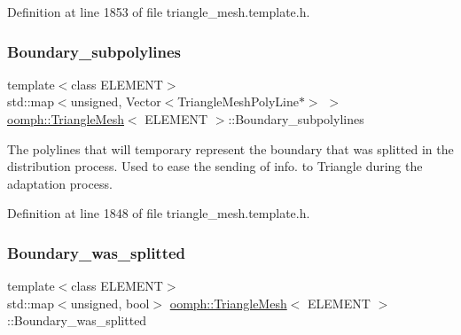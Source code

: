 Definition at line 1853 of file triangle\+\_\+mesh.\+template.\+h.

\mbox{\label{classoomph_1_1TriangleMesh_a4bc8a5ed3d771cec7c9f0de730b28a9f}} 
\subsubsection{\texorpdfstring{Boundary\+\_\+subpolylines}{Boundary\_subpolylines}}
{\footnotesize\ttfamily template$<$class E\+L\+E\+M\+E\+NT$>$ \\
std\+::map$<$unsigned, Vector$<$Triangle\+Mesh\+Poly\+Line$\ast$$>$ $>$ \hyperlink{classoomph_1_1TriangleMesh}{oomph\+::\+Triangle\+Mesh}$<$ E\+L\+E\+M\+E\+NT $>$\+::Boundary\+\_\+subpolylines\hspace{0.3cm}{\ttfamily [protected]}}



The polylines that will temporary represent the boundary that was splitted in the distribution process. Used to ease the sending of info. to Triangle during the adaptation process. 



Definition at line 1848 of file triangle\+\_\+mesh.\+template.\+h.

\mbox{\label{classoomph_1_1TriangleMesh_a62fcac1292abe84ba6b739260cdbfef5}} 
\subsubsection{\texorpdfstring{Boundary\+\_\+was\+\_\+splitted}{Boundary\_was\_splitted}}
{\footnotesize\ttfamily template$<$class E\+L\+E\+M\+E\+NT$>$ \\
std\+::map$<$unsigned, bool$>$ \hyperlink{classoomph_1_1TriangleMesh}{oomph\+::\+Triangle\+Mesh}$<$ E\+L\+E\+M\+E\+NT $>$\+::Boundary\+\_\+was\+\_\+splitted\hspace{0.3cm}{\ttfamily [protected]}}



